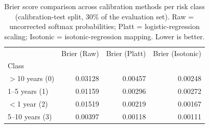 \documentclass{article}
\begin{document}
\begin{table}
\caption{Brier score comparison across calibration methods per risk class (calibration-test split, 30\% of the evaluation set). Raw = uncorrected softmax probabilities; Platt = logistic-regression scaling; Isotonic = isotonic-regression mapping. Lower is better.}
\label{tab:brier_comparison}
\begin{tabular}{lrrr}
\toprule
 & Brier (Raw) & Brier (Platt) & Brier (Isotonic) \\
Class &  &  &  \\
\midrule
$>$10 years (0) & 0.03128 & 0.00457 & 0.00248 \\
1–5 years (1) & 0.01159 & 0.00296 & 0.00272 \\
$<$1 year (2) & 0.01519 & 0.00219 & 0.00167 \\
5–10 years (3) & 0.00397 & 0.00118 & 0.00111 \\
\bottomrule
\end{tabular}
\end{table}

\begin{table}
\caption{Brier score comparison across calibration methods per risk class for BEHRT-LoRA, XGBoost, and Neural Network 
(calibration-test split, 30\% of the evaluation set), grouped by clinical risk category. 
Raw = uncorrected softmax/softprob probabilities; Platt = logistic-regression scaling; 
Isotonic = isotonic-regression mapping. Lower is better.}
\label{tab:brier_calibration_comparison}
\end{table}
\end{document}
